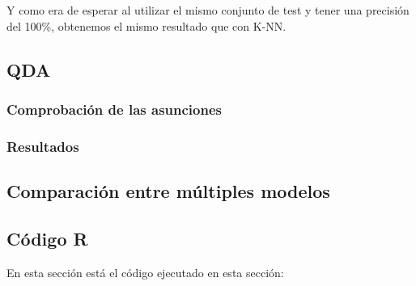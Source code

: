 \begin{figure}[H]
	\centering
	
	\label{fig:predicciones_lda}
\end{figure}

Y como era de esperar al utilizar el mismo conjunto de test y tener una precisión del 100\%, obtenemos el mismo resultado que con K-NN.

\subsection{QDA}

\subsubsection{Comprobación de las asunciones}

\subsubsection{Resultados}


\subsection{Comparación entre múltiples modelos}


\subsection{Código R}

En esta sección está el código ejecutado en esta sección:



